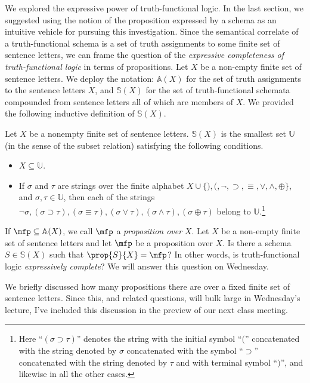 We explored the expressive power of truth-functional logic. %
In the last section, we suggested using the notion of the proposition expressed by a schema as an intuitive vehicle for pursuing this investigation. 
Since the semantical correlate of a truth-functional schema is a set of truth assignments to some finite set of sentence letters, we can frame the question of the \emph{expressive completeness of truth-functional logic} in terms of propositions. Let $X$ be a non-empty finite set of sentence letters. We deploy the notation: $\mathbb{A}(X)$ for the set of truth assignments to the sentence letters $X$, and $\mathbb{S}(X)$ for the set of truth-functional schemata compounded from sentence letters all of which are members of $X$. 
We provided the following inductive definition of $\mathbb{S}(X)$. 
\begin{definition}
Let $X$ be a nonempty finite set of sentence letters. $\mathbb{S}(X)$ is the smallest set $\mathbb{U}$ (in the sense of the subset relation) satisfying the following conditions.
\begin{itemize}
\item $X\subseteq \mathbb{U}$.
\item If $\sigma$ and $\tau$ are strings over the finite alphabet $X\cup\{),(,\neg,\supset,\equiv,\vee,\wedge,\oplus\}$, and $\sigma,\tau\in\mathbb{U}$, then each of the strings $\neg\sigma, (\sigma\supset\tau),(\sigma\equiv\tau),(\sigma\vee\tau),(\sigma\wedge\tau),(\sigma\oplus\tau)$ belong to $\mathbb{U}$.\footnote{Here ``$(\sigma\supset\tau)$'' denotes the string with the initial symbol ``$($'' concatenated with the string denoted by $\sigma$ concatenated with the symbol ``$\supset$'' concatenated with the string denoted by $\tau$ and with terminal symbol ``$)$'', and likewise in all the other cases.}
\end{itemize}
\end{definition}

If $\mfp\subseteq\mathbb{A}(X)$, we call $\mfp$ a \emph{proposition over} $X$. 
Let $X$ be a non-empty finite set of sentence letters and let $\mfp$ be a proposition over $X$. Is there a schema $S\in\mathbb{S}(X)$ such that $\prop{S}{X}=\mfp$? In other words, is truth-functional logic \emph{expressively complete}? We will answer this question on Wednesday. 

We briefly discussed how many propositions there are over a fixed finite set of sentence letters. Since this, and related questions, will bulk large in Wednesday's lecture, I've included this discussion in the preview of our next class meeting.

